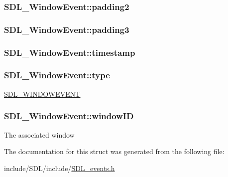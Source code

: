 \hypertarget{struct_s_d_l___window_event_a6bcf773b690b894e8c04c591826d0c8a}{
\subsubsection[{padding2}]{ S\-D\-L\-\_\-\-Window\-Event\-::padding2}}\label{struct_s_d_l___window_event_a6bcf773b690b894e8c04c591826d0c8a}
\hypertarget{struct_s_d_l___window_event_ac352263b5fa4ba6dbd64a48062d5e29f}{
\subsubsection[{padding3}]{ S\-D\-L\-\_\-\-Window\-Event\-::padding3}}\label{struct_s_d_l___window_event_ac352263b5fa4ba6dbd64a48062d5e29f}
\hypertarget{struct_s_d_l___window_event_a7b0bf569b20cfa4e3fb76e3301d616f9}{
\subsubsection[{timestamp}]{ S\-D\-L\-\_\-\-Window\-Event\-::timestamp}}\label{struct_s_d_l___window_event_a7b0bf569b20cfa4e3fb76e3301d616f9}
\hypertarget{struct_s_d_l___window_event_a01c8c8fbe8564e690f958d2db560f657}{
\subsubsection[{type}]{ S\-D\-L\-\_\-\-Window\-Event\-::type}}\label{struct_s_d_l___window_event_a01c8c8fbe8564e690f958d2db560f657}
\hyperlink{_s_d_l__events_8h_a3b589e89be6b35c02e0dd34a55f3fccaa5ff4e41f0d8b5def11cfe6a69ec0b698}{S\-D\-L\-\_\-\-W\-I\-N\-D\-O\-W\-E\-V\-E\-N\-T} \hypertarget{struct_s_d_l___window_event_a4b31796ffc84fbb7f6e9ba33e127619a}{
\subsubsection[{window\-I\-D}]{ S\-D\-L\-\_\-\-Window\-Event\-::window\-I\-D}}\label{struct_s_d_l___window_event_a4b31796ffc84fbb7f6e9ba33e127619a}
The associated window 

The documentation for this struct was generated from the following file\-:\begin{DoxyCompactItemize}
\item 
include/\-S\-D\-L/include/\hyperlink{_s_d_l__events_8h}{S\-D\-L\-\_\-events.\-h}\end{DoxyCompactItemize}

